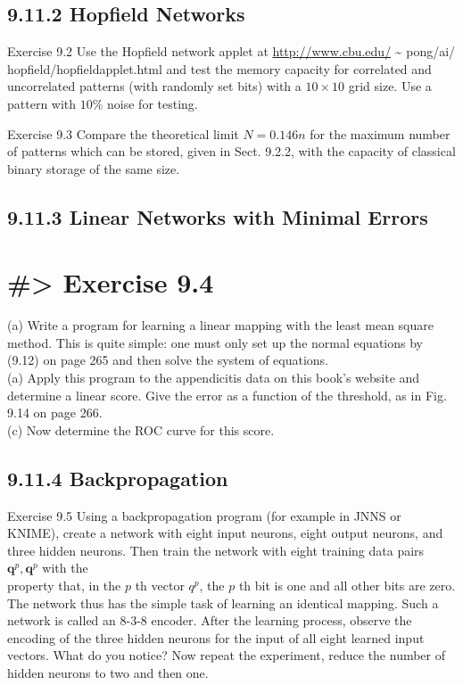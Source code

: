 \documentclass[10pt]{book}
\begin{document}
\begin{center}
\begin{enumerate}
\begin{center}
\begin{center}
\begin{center}
\subsection*{9.11.2 Hopfield Networks}
Exercise 9.2 Use the Hopfield network applet at \href{http://www.cbu.edu/}{http://www.cbu.edu/} \~{} pong/ai/ hopfield/hopfieldapplet.html and test the memory capacity for correlated and uncorrelated patterns (with randomly set bits) with a $10 \times 10$ grid size. Use a pattern with $10 \%$ noise for testing.

Exercise 9.3 Compare the theoretical limit $N=0.146 n$ for the maximum number of patterns which can be stored, given in Sect. 9.2.2, with the capacity of classical binary storage of the same size.

\subsection*{9.11.3 Linear Networks with Minimal Errors}
\section*{\#> Exercise 9.4}
(a) Write a program for learning a linear mapping with the least mean square method. This is quite simple: one must only set up the normal equations by (9.12) on page 265 and then solve the system of equations.\\
(a) Apply this program to the appendicitis data on this book's website and determine a linear score. Give the error as a function of the threshold, as in Fig. 9.14 on page 266.\\
(c) Now determine the ROC curve for this score.

\subsection*{9.11.4 Backpropagation}
Exercise 9.5 Using a backpropagation program (for example in JNNS or KNIME), create a network with eight input neurons, eight output neurons, and three hidden neurons. Then train the network with eight training data pairs $\boldsymbol{q}^{p}, \boldsymbol{q}^{p}$ with the\\
property that, in the $p$ th vector $q^{p}$, the $p$ th bit is one and all other bits are zero. The network thus has the simple task of learning an identical mapping. Such a network is called an 8-3-8 encoder. After the learning process, observe the encoding of the three hidden neurons for the input of all eight learned input vectors. What do you notice? Now repeat the experiment, reduce the number of hidden neurons to two and then one.



\end{center}
\end{center}
\end{center}
\end{enumerate}
\end{center}
\end{document}
